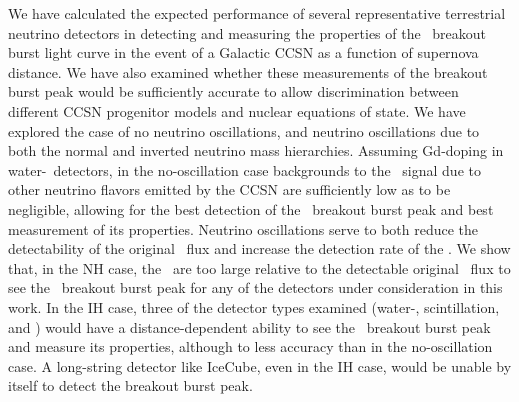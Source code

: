We have calculated the expected performance of several representative
terrestrial neutrino detectors in detecting and measuring the
properties of the \nue\ breakout burst light curve in the event of a Galactic
CCSN as a function of supernova distance. We have also examined
whether these measurements of the breakout burst peak would be
sufficiently accurate to allow discrimination between different CCSN
progenitor models and nuclear equations of state.  We have explored the case
of no neutrino oscillations, and neutrino oscillations due to
both the normal and inverted neutrino mass hierarchies.  Assuming
Gd-doping in water-\cer\ detectors, in the no-oscillation case
 backgrounds to the \nue\ signal 
due to other neutrino flavors emitted by the CCSN
are sufficiently low as to be negligible, allowing for the best
detection of the \nue\ breakout burst peak and best measurement of its
properties. Neutrino oscillations serve to both reduce the
detectability of the original \nue\ flux and increase the
detection rate of the \background.  We show that, in the NH
case, the \backgrounds\ are too large relative to the detectable original
\nue\ flux to see the \nue\ breakout burst peak for any of the
detectors under consideration in this work.  In the IH case,
three of
the detector types examined (water-\cer, scintillation, and
) would have a distance-dependent ability to see the
\nue\ breakout burst peak and measure its properties, although to less
accuracy than in the no-oscillation case.  A long-string detector
like IceCube, even in the IH case, would be unable by itself to
detect the breakout burst peak.

